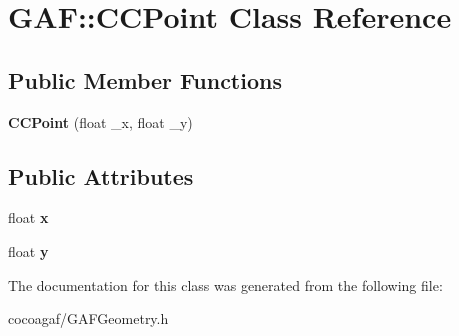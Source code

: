 \hypertarget{class_g_a_f_1_1_c_c_point}{\section{G\-A\-F\-:\-:C\-C\-Point Class Reference}
\label{class_g_a_f_1_1_c_c_point}
}
\subsection*{Public Member Functions}
\begin{DoxyCompactItemize}
\item 
\hypertarget{class_g_a_f_1_1_c_c_point_aa4d9cdbb6f24e6f808a0e9fe2d4e61a3}{{\bfseries C\-C\-Point} (float \-\_\-x, float \-\_\-y)}\label{class_g_a_f_1_1_c_c_point_aa4d9cdbb6f24e6f808a0e9fe2d4e61a3}

\end{DoxyCompactItemize}
\subsection*{Public Attributes}
\begin{DoxyCompactItemize}
\item 
\hypertarget{class_g_a_f_1_1_c_c_point_ac90f32d335c2329da2797d0ed87b901a}{float {\bfseries x}}\label{class_g_a_f_1_1_c_c_point_ac90f32d335c2329da2797d0ed87b901a}

\item 
\hypertarget{class_g_a_f_1_1_c_c_point_a11bffcec6c48c0090443a23de93cb431}{float {\bfseries y}}\label{class_g_a_f_1_1_c_c_point_a11bffcec6c48c0090443a23de93cb431}

\end{DoxyCompactItemize}


The documentation for this class was generated from the following file\-:\begin{DoxyCompactItemize}
\item 
cocoagaf/G\-A\-F\-Geometry.\-h\end{DoxyCompactItemize}

